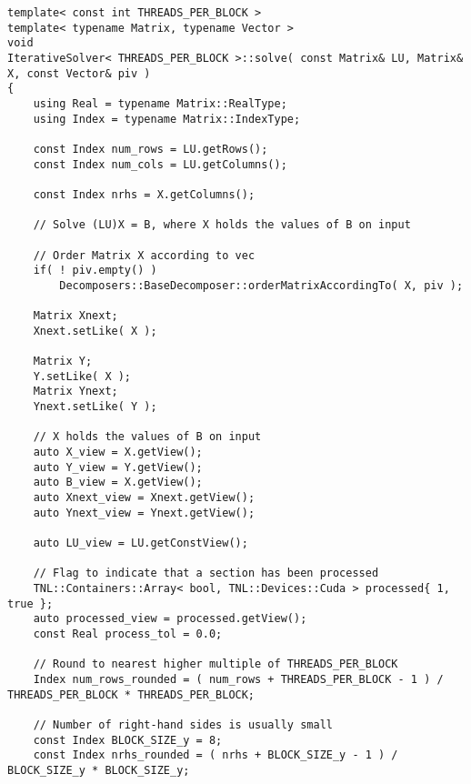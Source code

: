 \begin{lstlisting}[caption={Excerpt from the implementation of IS\_$x$PP.
The code has been slightly modified for brevity, for example, the checks for appropriate sizing of matrices and vectors have been removed.
Note that the CUDA thread blocks used in the implementation are larger in the 1st dimension.
Threads adjacent in the 1st dimension are assigned to neighboring elements in the same column since the matrices are stored in column-major order on the GPU.
In other words, to mitigate misaligned global memory access, the 1st dimension of threads is used to access elements in a single column and the 2nd dimension is used to differentiate between right-hand sides.},label={Listing:ISxPP-implementation-excerpt},escapechar=@]
template< const int THREADS_PER_BLOCK >
template< typename Matrix, typename Vector >
void
IterativeSolver< THREADS_PER_BLOCK >::solve( const Matrix& LU, Matrix& X, const Vector& piv )
{
	using Real = typename Matrix::RealType;
	using Index = typename Matrix::IndexType;
	
	const Index num_rows = LU.getRows();
	const Index num_cols = LU.getColumns();
	
	const Index nrhs = X.getColumns();
	
	// Solve (LU)X = B, where X holds the values of B on input
	
	// Order Matrix X according to vec
	if( ! piv.empty() )
		Decomposers::BaseDecomposer::orderMatrixAccordingTo( X, piv );
	
	Matrix Xnext;
	Xnext.setLike( X );
	
	Matrix Y;
	Y.setLike( X );
	Matrix Ynext;
	Ynext.setLike( Y );
	
	// X holds the values of B on input
	auto X_view = X.getView();
	auto Y_view = Y.getView();
	auto B_view = X.getView();
	auto Xnext_view = Xnext.getView();
	auto Ynext_view = Ynext.getView();
	
	auto LU_view = LU.getConstView();
	
	// Flag to indicate that a section has been processed
	TNL::Containers::Array< bool, TNL::Devices::Cuda > processed{ 1, true };
	auto processed_view = processed.getView();
	const Real process_tol = 0.0;
	
	// Round to nearest higher multiple of THREADS_PER_BLOCK
	Index num_rows_rounded = ( num_rows + THREADS_PER_BLOCK - 1 ) / THREADS_PER_BLOCK * THREADS_PER_BLOCK;
	
	// Number of right-hand sides is usually small
	const Index BLOCK_SIZE_y = 8;
	const Index nrhs_rounded = ( nrhs + BLOCK_SIZE_y - 1 ) / BLOCK_SIZE_y * BLOCK_SIZE_y;
	

\end{lstlisting}
